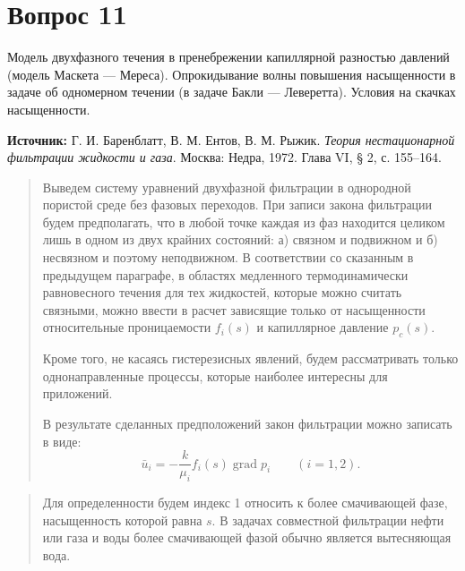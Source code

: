 \documentclass[12pt,a4paper]{article}
\DeclareMathOperator{\grad}{grad}
\begin{document}
\section*{Вопрос 11}
Модель двухфазного течения в пренебрежении капиллярной разностью давлений (модель Маскета — Мереса). Опрокидывание волны повышения насыщенности в задаче об одномерном течении (в задаче Бакли — Леверетта). Условия на скачках насыщенности.

\medskip
\noindent\textbf{Источник:} Г. И. Баренблатт, В. М. Ентов, В. М. Рыжик. \textit{Теория нестационарной фильтрации жидкости и газа}. Москва: Недра, 1972. Глава VI, § 2, с. 155--164.
\par\bigskip
\begin{quote}\sloppy
Выведем систему уравнений двухфазной фильтрации в однородной пористой среде без фазовых переходов. При записи закона фильтрации будем предполагать, что в любой точке каждая из фаз находится целиком лишь в одном из двух крайних состояний: а) связном и подвижном и б) несвязном и поэтому неподвижном. В соответствии со сказанным в предыдущем параграфе, в областях медленного термодинамически равновесного течения для тех жидкостей, которые можно считать связными, можно ввести в расчет зависящие только от насыщенности относительные проницаемости $f_i(s)$ и капиллярное давление $p_c(s)$.

Кроме того, не касаясь гистерезисных явлений, будем рассматривать только однонаправленные процессы, которые наиболее интересны для приложений.

В результате сделанных предположений закон фильтрации можно записать в виде:
\begin{equation}\bar u_i=-\frac{k}{\mu_i}f_i(s)\grad p_i\qquad(i=1,2).\tag{VI.2.1}\label{q11:eq-VI-2-1}\end{equation}
\par\nobreak{}\par
\end{quote}

\begin{quote}\sloppy
Для определенности будем индекс 1 относить к более смачивающей фазе, насыщенность которой равна $s$. В задачах совместной фильтрации нефти или газа и воды более смачивающей фазой обычно является вытесняющая вода.
\par\nobreak{}\par
\end{quote}
\end{document}
